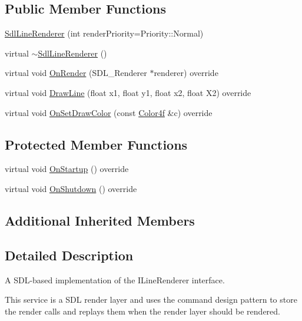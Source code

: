 \subsection*{Public Member Functions}
\begin{DoxyCompactItemize}
\item 
\hyperlink{classastu_1_1SdlLineRenderer_a06b6b37f054292e1a5bffa2fd095d1da}{Sdl\+Line\+Renderer} (int render\+Priority=Priority\+::\+Normal)
\item 
virtual \hyperlink{classastu_1_1SdlLineRenderer_a9fd9f408267d553afeb00886fc1272b2}{$\sim$\+Sdl\+Line\+Renderer} ()
\item 
virtual void \hyperlink{classastu_1_1SdlLineRenderer_a8860a2549acc8c633df71c7ceeb68c0d}{On\+Render} (S\+D\+L\+\_\+\+Renderer $\ast$renderer) override
\item 
virtual void \hyperlink{classastu_1_1SdlLineRenderer_a1f6c5c142df597e2abc1bf45c2a03bd2}{Draw\+Line} (float x1, float y1, float x2, float X2) override
\item 
virtual void \hyperlink{classastu_1_1SdlLineRenderer_aefdce772cba5d63ad8c4608df63879f9}{On\+Set\+Draw\+Color} (const \hyperlink{classastu_1_1Color}{Color4f} \&c) override
\end{DoxyCompactItemize}
\subsection*{Protected Member Functions}
\begin{DoxyCompactItemize}
\item 
virtual void \hyperlink{classastu_1_1SdlLineRenderer_abe90e838b83f67c5e336d1b95cdea8a0}{On\+Startup} () override
\item 
virtual void \hyperlink{classastu_1_1SdlLineRenderer_ae34a6e853b012a77bb3377314332d7a5}{On\+Shutdown} () override
\end{DoxyCompactItemize}
\subsection*{Additional Inherited Members}


\subsection{Detailed Description}
A S\+D\+L-\/based implementation of the I\+Line\+Renderer interface.

This service is a S\+DL render layer and uses the command design pattern to store the render calls and replays them when the render layer should be rendered. 


